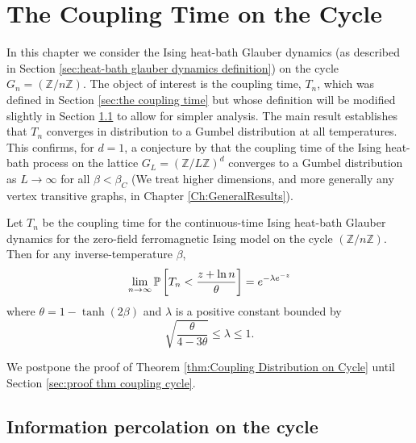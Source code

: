 \chapter{The Coupling Time on the Cycle}
\label{Ch:1D}


	In this chapter we consider the Ising heat-bath Glauber dynamics (as described in Section \ref{sec:heat-bath glauber dynamics definition}) on the cycle $G_n = (\mathbb{Z}/n\mathbb{Z})$. The object of interest is the coupling time, $T_n$, which was defined in Section \ref{sec:the coupling time} but whose definition will be modified slightly in Section \ref{sec:information percolation on the cycle} to allow for simpler analysis. The main result establishes that $T_n$ converges in distribution to a Gumbel distribution at all temperatures. This confirms, for $d = 1$, a conjecture by \citeauthor{Collevecchio2017-nq} that the coupling time of the Ising heat-bath process on the lattice $G_L = (\mathbb{Z}/L\mathbb{Z})^d$ converges to a Gumbel distribution as $L \rightarrow \infty$ for all $\beta < \beta_C$ \cite[Conjecture 7.1]{Collevecchio2017-nq} (We treat higher dimensions, and more generally any vertex transitive graphs, in Chapter \ref{Ch:GeneralResults}).

	\begin{theorem}
	\label{thm:Coupling Distribution on Cycle}
		Let $T_n$ be the coupling time for the continuous-time Ising heat-bath Glauber dynamics for the zero-field ferromagnetic Ising model on the cycle $(\mathbb{Z} / n\mathbb{Z})$. Then for any inverse-temperature $\beta$,
		\begin{equation}
			\lim_{n \rightarrow \infty} \mathbb{P}\left[T_n < \frac{z + \ln n}{\theta}\right] = e^{-\lambda e^{-z}}
		\end{equation}
		where $\theta = 1 - \tanh(2\beta)$ and $\lambda$ is a positive constant bounded by
		\begin{equation}
			\sqrt{\frac{\theta}{4 - 3\theta}} \leq \lambda \leq 1.
		\end{equation}
	\end{theorem}

	We postpone the proof of Theorem \ref{thm:Coupling Distribution on Cycle} until Section \ref{sec:proof thm coupling cycle}. 

	\section{Information percolation on the cycle}
	\label{sec:information percolation on the cycle}

